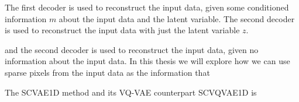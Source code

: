 The first decoder is used to reconstruct the input data, given some conditioned information $m$ about the input data and the latent variable. The second decoder is used to reconstruct the input data with just the latent variable $z$.

and the second decoder is used to reconstruct the input data, given no information about the input data. In this thesis we will explore how we can use sparse pixels from the input data as the information that 

The SCVAE1D method and its VQ-VAE counterpart SCVQVAE1D is 





